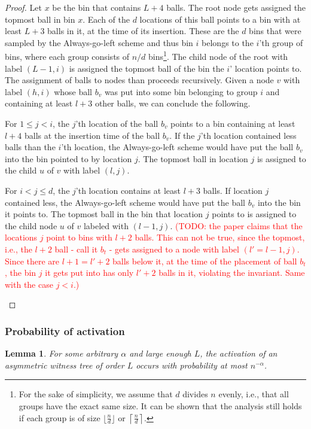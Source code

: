 \documentclass[a4paper,12pt]{article}
\newcommand\todo[1]{\textcolor{red}{(TODO: #1)}}
\newtheorem{lemma}{Lemma}
\begin{document}
\begin{proof}
Let $x$ be the bin that contains $L+4$ balls. The root node gets assigned the topmost ball in bin $x$. Each of the $d$ locations of this ball points to a bin with at least $L+3$ balls in it, at the time of its insertion. These are the $d$ bins that were sampled by the Always-go-left scheme and thus bin $i$ belongs to the $i$'th group of bins, where each group consists of $n/d$ bins\footnote{For the sake of simplicity, we assume that $d$ divides $n$ evenly, i.e., that all groups have the exact same size. It can be shown that the analysis still holds if each group is of size $\lfloor\frac{n}{d}\rfloor$ or $\left\lceil\frac{n}{d}\right\rceil$.}. The child node of the root with label $(L-1, i)$ is assigned the topmost ball of the bin the $i$' location points to. The assignment of balls to nodes than proceeds recursively. Given a node $v$ with label $(h, i)$ whose ball $b_v$ was put into some bin belonging to group $i$ and containing at least $l+3$ other balls, we can conclude the following.
\begin{compactitem}
\item For $1\leq j < i$, the $j$'th location of the ball $b_v$ points to a bin containing at least $l+4$ balls at the insertion time of the ball $b_v$. If the $j$'th location contained less balls than the $i$'th location, the Always-go-left scheme would have put the ball $b_v$ into the bin pointed to by location $j$. The topmost ball in location $j$ is assigned to the  child $u$ of $v$ with label $(l,j)$. 
\item For $i < j \leq d$, the $j$'th location contains at least $l+3$ balls. If location $j$ contained less, the Always-go-left scheme would have put the ball $b_v$ into the bin it points to. The topmost ball in the bin that location $j$ points to is assigned to the child node $u$ of $v$ labeled with $(l-1, j)$. \todo{the paper claims that the locations $j$ point to bins with $l+2$ balls. This can not be true, since the topmost, i.e., the $l+2$ ball - call it $b_t$ - gets assigned to a node with label $(l'=l-1, j)$. Since there are $l+1=l'+2$ balls below it, at the time of the placement of ball $b_t$, the bin $j$ it gets put into has only $l'+2$ balls in it, violating the invariant. Same with the case $j<i$.} 
\end{compactitem}
\end{proof}

\subsubsection{Probability of activation}
\label{sec:analysis:probabilityAsymWT}
\begin{lemma}\label{lemma:awt:activation}
For some arbitrary $\alpha$ and large enough $L$, the activation of an asymmetric witness tree of order $L$ occurs with probability at most $n^{-\alpha}$.
\end{lemma}
\end{document}

